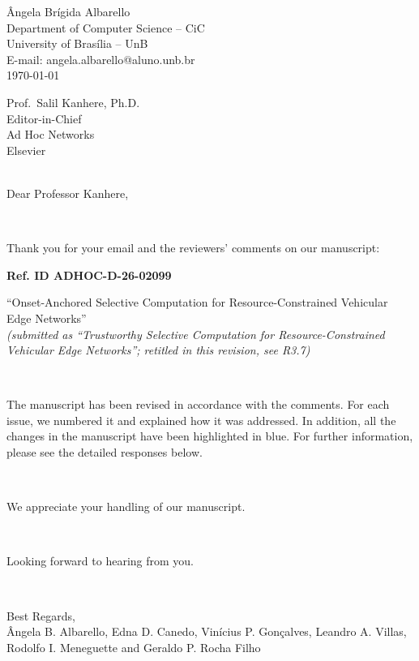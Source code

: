 \documentclass[1p,12pt,authoryear]{elsarticle}
\begin{document}
\begin{flushright}
\^Angela Br\'igida Albarello \\
Department of Computer Science -- CiC \\
University of Bras\'ilia -- UnB \\
E-mail: angela.albarello@aluno.unb.br \\
\today \\
\end{flushright}

\noindent Prof.\ Salil Kanhere, Ph.D. \\
\noindent Editor-in-Chief \\
\noindent Ad Hoc Networks \\
\noindent Elsevier \\

~

\noindent Dear Professor Kanhere,

~

\noindent Thank you for your email and the reviewers' comments on our manuscript:

\begin{center}
\textbf{Ref. ID ADHOC-D-26-02099}

``Onset-Anchored Selective Computation for Resource-Constrained Vehicular Edge Networks''\\[2pt]
{\normalsize\itshape (submitted as ``Trustworthy Selective Computation for Resource-Constrained Vehicular Edge Networks''; retitled in this revision, see R3.7)}
\end{center}

~

\noindent The manuscript has been revised in accordance with the comments. For each issue, we numbered it and explained how it was addressed. In addition, all the changes in the manuscript have been highlighted in blue. For further information, please see the detailed responses below.

~

\noindent We appreciate your handling of our manuscript.

~

\noindent Looking forward to hearing from you.

~

\noindent Best Regards,\\
\noindent \^Angela B. Albarello, Edna D. Canedo, Vin\'icius P. Gon\c{c}alves, Leandro A. Villas, Rodolfo I. Meneguette and Geraldo P. Rocha Filho
\end{document}
